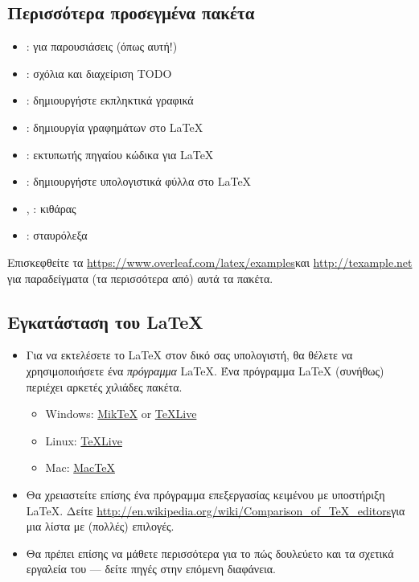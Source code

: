 \documentclass{beamer}
\begin{document}
\subsection{Περισσότερα προσεγμένα πακέτα}
\begin{frame}{\insertsubsection}
\begin{itemize}
\item \en{}\gr: για παρουσιάσεις (όπως αυτή!)
\item \en{}\gr: σχόλια και διαχείριση \en TODO\gr
\item \en{}\gr: δημιουργήστε εκπληκτικά γραφικά
\item \en{}\gr: δημιουργία γραφημάτων στο \LaTeX
\item \en{}\gr: εκτυπωτής πηγαίου κώδικα για \LaTeX
\item \en{}\gr: δημιουργήστε υπολογιστικά φύλλα στο \LaTeX
\item \en{}, \gr: κιθάρας
\item \en{}\gr: σταυρόλεξα
\end{itemize}
Επισκεφθείτε τα \space \en\url{https://www.overleaf.com/latex/examples}\gr \space και \en \url{http://texample.net}\gr \space
για παραδείγματα (τα περισσότερα από) αυτά τα πακέτα.
\end{frame}

\subsection{Εγκατάσταση του \LaTeX{}}
\begin{frame}{\insertsubsection}
\begin{itemize}
\item Για να εκτελέσετε το \LaTeX{} στον δικό σας υπολογιστή, θα θέλετε να χρησιμοποιήσετε ένα \emph{πρόγραμμα} \LaTeX{}. Ένα πρόγραμμα \LaTeX{} (συνήθως) περιέχει αρκετές χιλιάδες πακέτα.
\en
\begin{itemize}
\item  Windows: \href{http://miktex.org/}{Mik\TeX} or \href{http://tug.org/texlive/}{\TeX Live}
\item  Linux: \href{http://tug.org/texlive/}{\TeX Live}
\item  Mac: \href{http://tug.org/mactex/}{Mac\TeX}
\end{itemize}
\gr
\item Θα χρειαστείτε επίσης ένα πρόγραμμα επεξεργασίας κειμένου με υποστήριξη \LaTeX{}. Δείτε \en \url{http://en.wikipedia.org/wiki/Comparison_of_TeX_editors}\gr για μια λίστα με (πολλές) επιλογές.
\item Θα πρέπει επίσης να μάθετε περισσότερα για το πώς δουλεύετο \en {} \gr και τα σχετικά εργαλεία του --- δείτε πηγές στην επόμενη διαφάνεια.
\end{itemize}
\end{frame}
\end{document}
